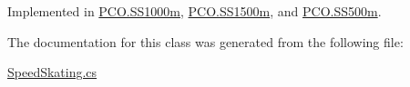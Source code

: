 Implemented in \hyperlink{classPCO_1_1SS1000m_a20cf8a97d91bb661439b1c251942b68a}{P\+C\+O.\+S\+S1000m}, \hyperlink{classPCO_1_1SS1500m_acd55a4c8b05bfe2acfebe0bb9bf58d26}{P\+C\+O.\+S\+S1500m}, and \hyperlink{classPCO_1_1SS500m_a57b859e56912c44aee51ac2854f5ce9c}{P\+C\+O.\+S\+S500m}.



The documentation for this class was generated from the following file\+:\begin{DoxyCompactItemize}
\item 
\hyperlink{SpeedSkating_8cs}{Speed\+Skating.\+cs}\end{DoxyCompactItemize}

